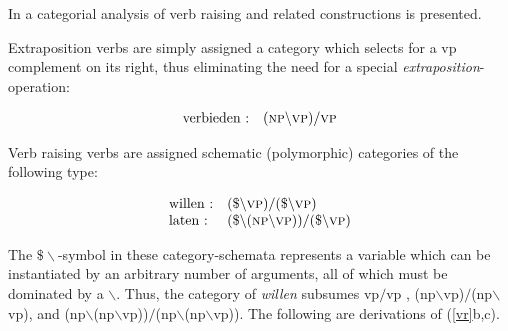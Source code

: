 In   a categorial analysis of verb raising and 
related constructions is presented. 

Extraposition verbs are simply assigned a category which selects for a {\sc vp} 
complement on its right, thus eliminating the  need for a special  {\em 
extraposition}-operation:

\begin{equation}
\begin{array}[t]{ll}
\mbox{verbieden :} & (\mbox{\sc np}\backslash\mbox{\sc vp})/ \mbox{\sc vp}
\end{array}
\end{equation}


Verb raising verbs are assigned schematic (polymorphic) categories of the 
following 
type:
 
\begin{equation}
\begin{array}[t]{ll}
\mbox{willen :} & (\$\backslash \mbox{\sc vp})/(\$\backslash \mbox{\sc vp} ) \\ 
\mbox{laten :} & (\$\backslash (\mbox{\sc np}\backslash\mbox{\sc vp}))/
						(\$\backslash \mbox{\sc vp} )
\end{array}
\end{equation}

The $\$\backslash$-symbol in these category-schemata represents a variable which 
can be instantiated by an arbitrary number of arguments, all of which must be 
dominated by a $\backslash$. Thus, the category of {\em willen} subsumes
{\sc vp$/$vp , (np$\backslash$vp)$/$(np$\backslash $vp)}, and {\sc 
(np$\backslash$(np$\backslash$vp))$/$(np$\backslash$(np$\backslash $vp))}.
The following are derivations of (\ref{vr}b,c).

